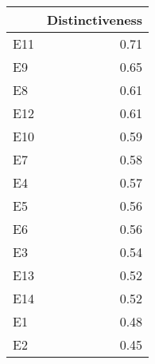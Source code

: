 \begin{table}

\caption{}
\centering
\begin{tabular}[t]{lr}
\toprule
  & Distinctiveness\\
\midrule
E11 & 0.71\\
E9 & 0.65\\
E8 & 0.61\\
E12 & 0.61\\
E10 & 0.59\\
E7 & 0.58\\
E4 & 0.57\\
E5 & 0.56\\
E6 & 0.56\\
E3 & 0.54\\
E13 & 0.52\\
E14 & 0.52\\
E1 & 0.48\\
E2 & 0.45\\
\bottomrule
\end{tabular}
\end{table}
